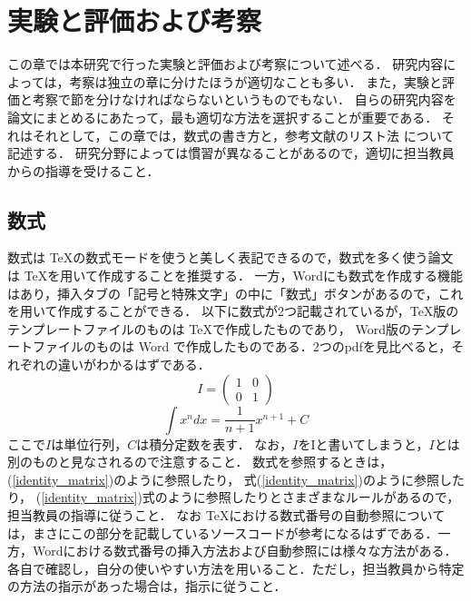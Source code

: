 \chapter{実験と評価および考察}	%
\thispagestyle{plain}   %

この章では本研究で行った実験と評価および考察について述べる．
研究内容によっては，考察は独立の章に分けたほうが適切なことも多い．
また，実験と評価と考察で節を分けなければならないというものでもない．
自らの研究内容を論文にまとめるにあたって，最も適切な方法を選択することが重要である．
それはそれとして，この章では，数式の書き方と，参考文献のリスト法
について記述する．
研究分野によっては慣習が異なることがあるので，適切に担当教員からの指導を受けること．

\section{数式}
数式は \TeX の数式モードを使うと美しく表記できるので，数式を多く使う論文は \TeX を用いて作成することを推奨する．
一方，Wordにも数式を作成する機能はあり，挿入タブの「記号と特殊文字」の中に「数式」ボタンがあるので，これを用いて作成することができる．
以下に数式が2つ記載されているが，\TeX 版のテンプレートファイルのものは \TeX で作成したものであり，
Word版のテンプレートファイルのものは Word で作成したものである．2つのpdfを見比べると，それぞれの違いがわかるはずである．
\begin{equation} \label{identity_matrix}
I=\begin{pmatrix} 1 & 0 \\ 0 & 1 \end{pmatrix}
\end{equation}
\begin{equation} \label{integral}
\int x^n dx =\frac{1}{n+1} x^{n+1} +C 
\end{equation}
ここで$I$は単位行列，$C$は積分定数を表す．
なお，$I$をIと書いてしまうと，$I$とは別のものと見なされるので注意すること．
数式を参照するときは，(\ref{identity_matrix})のように参照したり，
式(\ref{identity_matrix})のように参照したり，
(\ref{identity_matrix})式のように参照したりとさまざまなルールがあるので，
担当教員の指導に従うこと．
なお \TeX における数式番号の自動参照については，まさにこの部分を記載しているソースコードが参考になるはずである．一方，Wordにおける数式番号の挿入方法および自動参照には様々な方法がある．各自で確認し，自分の使いやすい方法を用いること．ただし，担当教員から特定の方法の指示があった場合は，指示に従うこと．


